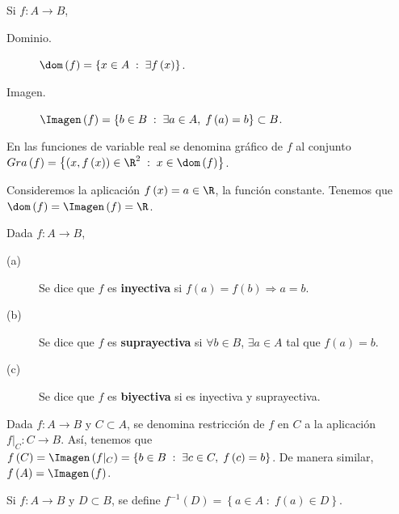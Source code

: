 \begin{fdefinition}[]
\normalfont Si $\displaystyle f : A \to B $,
\begin{description}
	\item[Dominio.] $\displaystyle \dom\left(f\right) = \left\{ x \in A \; : \; \exists f\left(x\right)\right\}  $.
	\item[Imagen.] $\displaystyle \Imagen\left(f\right) = \left\{ b \in B \; : \; \exists a \in A, \; f\left(a\right) = b\right\} \subset B $.
\end{description}
\end{fdefinition}

\begin{notation}
	\normalfont En las funciones de variable real se denomina gráfico de $\displaystyle f $ al conjunto $\displaystyle Gra\left(f\right) = \left\{ \left(x, f\left(x\right)\right) \in \R^{2} \; : \; x \in \dom\left(f\right)\right\}  $.
\end{notation}
\begin{eg}
\normalfont Consideremos la aplicación $\displaystyle f\left(x\right) = a \in \R $, la función constante. Tenemos que $\displaystyle \dom\left(f\right) = \Imagen\left(f\right) = \R $.
\end{eg}

\begin{fdefinition}[]
\normalfont Dada $\displaystyle f : A \to B $,
\begin{description}
\item[(a)] Se dice que $\displaystyle f $ es \textbf{inyectiva} si $\displaystyle f\left(a\right) = f\left(b\right) \Rightarrow a = b $.
\item[(b)] Se dice que $\displaystyle f $ es \textbf{suprayectiva} si $\displaystyle \forall b \in B $, $\displaystyle \exists a \in A $ tal que $\displaystyle f\left(a\right) = b $.
\item[(c)] Se dice que $\displaystyle f $ es \textbf{biyectiva} si es inyectiva y suprayectiva.
\end{description}
\end{fdefinition}

\begin{notation}
	\normalfont Dada $\displaystyle f : A \to B $ y $\displaystyle C \subset A $, se denomina restricción de $\displaystyle f $ en $\displaystyle C $ a la aplicación $\displaystyle f |_{C} : C \to B $. Así, tenemos que $\displaystyle f\left(C\right) = \Imagen\left(f | _{C}\right) = \left\{ b \in B \; : \; \exists c \in C, \; f\left(c\right) = b\right\}  $. De manera similar, $\displaystyle f\left(A\right) = \Imagen\left(f\right) $. 
\end{notation}
\begin{notation}
	\normalfont Si $\displaystyle f : A \to B $ y $\displaystyle D \subset B $, se define $\displaystyle f^{-1}\left(D\right) = \left\{ a \in A \; : \; f\left(a\right) \in D\right\}  $.
\end{notation}

